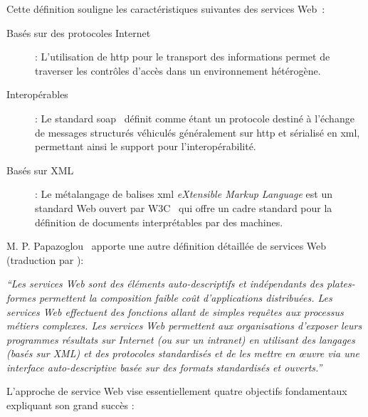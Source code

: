   Cette définition souligne les caractéristiques suivantes des
  services Web~\cite{fremantle2002enterprise}:

  \renewcommand{\descriptionlabel}[1]{\hspace{0.5cm}\textbullet~\textsf{#1}}
  \begin{description}
  \item[Basés sur des protocoles Internet]: L'utilisation de
    \acrshort{http} pour le transport des informations permet de
    traverser les contrôles d'accès dans un environnement hétérogène.

  \item[Interopérables]: Le standard
    \acrshort{soap}~\cite{box2000simple} définit comme étant un
    protocole destiné à l'échange de messages structurés véhiculés
    généralement sur \acrshort{http} et sérialisé en \acrshort{xml},
    permettant ainsi le support pour l'interopérabilité.

  \item[Basés sur XML]: Le métalangage de balises \acrshort{xml}
    \textit{eXtensible Markup Language} est un standard Web ouvert par
    \textsc{W3C}~\cite{bray1998extensible} qui offre un cadre standard
    pour la définition de documents interprétables par des machines.
  \end{description}
  \enddescription

  M. P. Papazoglou~\cite{papazoglou2003service} apporte une autre
  définition détaillée de services Web (traduction par
  \cite{driss2011approche}):\bigskip

  \textit{``Les services Web sont des éléments auto-descriptifs et
    indépendants des plates-formes permettent la composition faible
    coût d’applications distribuées. Les services Web effectuent des
    fonctions allant de simples requêtes aux processus métiers
    complexes. Les services Web permettent aux organisations d'exposer
    leurs programmes résultats sur Internet (ou sur un intranet) en
    utilisant des langages (basés sur XML) et des protocoles
    standardisés et de les mettre en œuvre via une interface
    auto-descriptive basée sur des formats standardisés et
    ouverts.''}\bigskip

  L'approche de service Web vise essentiellement quatre objectifs
  fondamentaux expliquant son grand succès \cite{driss2011approche}:

